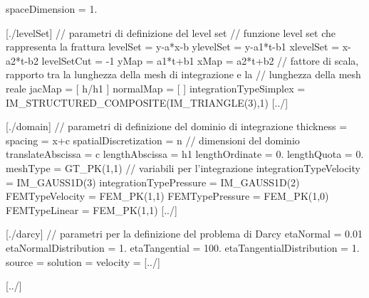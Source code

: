\begin{Code03_01}[caption={Definizione della frattura}]
[fractureData]

spaceDimension = 1.

   [./levelSet]		// parametri di definizione del level set
     // funzione level set che rappresenta la frattura
     levelSet = y-a*x-b 			
     ylevelSet = y-a1*t-b1 			
     xlevelSet = x-a2*t-b2				          
     levelSetCut = -1	
     yMap = a1*t+b1					
     xMap = a2*t+b2				
     // fattore di scala, rapporto tra la lunghezza della mesh di integrazione e la 
     // lunghezza della mesh reale
     jacMap = [ h/h1 ]				
     normalMap = [ ]					
     integrationTypeSimplex = IM_STRUCTURED_COMPOSITE(IM_TRIANGLE(3),1)
   [../]

   [./domain]		// parametri di definizione del dominio di integrazione
     thickness = 
     spacing = x+c      	
     spatialDiscretization = n
     // dimensioni del dominio
     translateAbscissa = c
     lengthAbscissa = h1
     lengthOrdinate = 0.
     lengthQuota = 0.
     meshType = GT_PK(1,1)
     // variabili per l'integrazione
     integrationTypeVelocity = IM_GAUSS1D(3)
     integrationTypePressure = IM_GAUSS1D(2)		
     FEMTypeVelocity = FEM_PK(1,1)
     FEMTypePressure = FEM_PK(1,0)
     FEMTypeLinear = FEM_PK(1,1)
   [../]

   [./darcy]		// parametri per la definizione del problema di Darcy
     etaNormal = 0.01
     etaNormalDistribution = 1. 
     etaTangential = 100.
     etaTangentialDistribution = 1.
     source = 
     solution = 
     velocity = 
   [../]

[../]

\end{Code03_01}





